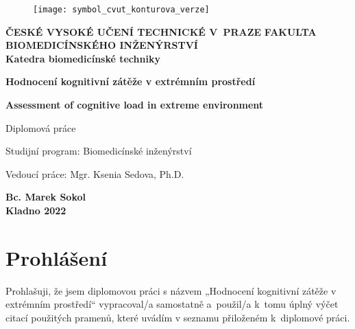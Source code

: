 \documentclass[a4paper,12pt,czech,oneside]{memoir}
\def\uv#1{„#1“}
\numberwithin{equation}{chapter}
\newcommand{\autor}{Bc. Marek Sokol}
\newcommand{\vedouci}{Mgr. Ksenia Sedova, Ph.D.}
\newcommand{\nazev}{Hodnocení kognitivní zátěže v extrémním prostředí}
\newcommand{\nazevENG}{Assessment of cognitive load in extreme environment}
\newcommand{\typ}{Diplomová práce}
\newcommand{\rok}{2022}
\newcommand{\program}{Biomedicínské inženýrství}
\newcommand{\fakulta}{FAKULTA BIOMEDICÍNSKÉHO INŽENÝRSTVÍ}
\newcommand{\cvut}{ČESKÉ VYSOKÉ UČENÍ TECHNICKÉ V~PRAZE}
\newcommand{\katedra}{Katedra biomedicínské techniky}
\begin{document}
\pagestyle{empty}
\begin{titlingpage}
	\begin{center}
		\begin{figure}[!h]
			\centering
			\texttt{[image: symbol\_cvut\_konturova\_verze]}
		\end{figure}
		\textsf{\large{\textbf{\cvut}}}
		{\color{NavyBlue}\makebox[\linewidth]{\rule[.2\baselineskip]{\textwidth}{0.4mm}}}
		\textsf{\normalsize{\textbf{\fakulta}}}\\

		\textsf{\textbf{\katedra}}

		\vfill

		\textsf{\Large{\textbf{\nazev}}}

		\vspace{36pt}

		\textsf{\Large{\textbf{\nazevENG}}}

		\vspace{48pt}

		\textsf{\typ}

		\vfill

	\end{center}
	\textsf{Studijní program: \program}

	\vspace{12pt}

	\noindent\textsf{Vedoucí práce: \vedouci}

	\vspace{24pt}

	\begin{center}
		\textsf{\textbf{\autor}} \\ [0.5cm]
		{\color{NavyBlue}\makebox[\linewidth]{\rule{\textwidth}{0.4mm}}}
		\textsf{\textbf{Kladno \rok}}
	\end{center}
\end{titlingpage}

% 

\null\vfill
\section*{Prohlášení}
Prohlašuji, že jsem diplomovou práci s názvem \uv{\nazev} vypracoval/a
samostatně a~použil/a k~tomu úplný výčet citací použitých pramenů, které uvádím
v seznamu přiloženém k~diplomové práci.
\end{document}
